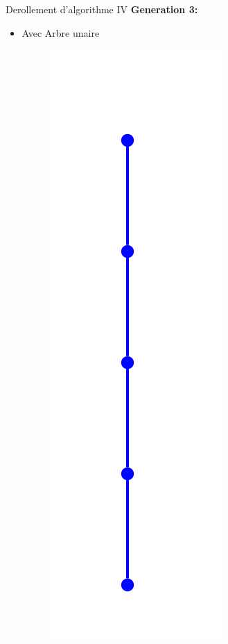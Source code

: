 \documentclass{beamer}
\begin{document}
\begin{frame}{Derollement d'algorithme IV}
\textbf{Generation 3:}\\
\begin{itemize}
\item  Avec Arbre unaire
\begin{figure}[h]
  \centering
  \includegraphics[scale=0.17]{gen3-1.png}
\end{figure}
\end{itemize}
\end{frame}
\end{document}
